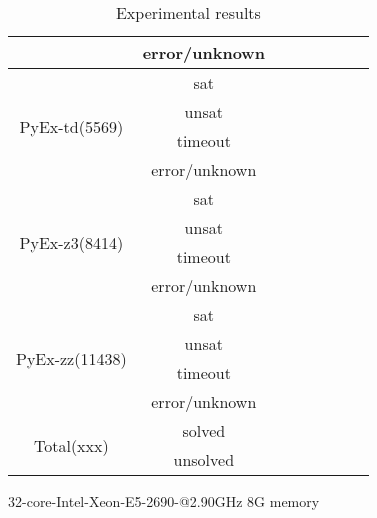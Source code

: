 \begin{table}[htbp]
\begin{center}
\begin{tabular}{|c|c|c|c|c|c|c|c|}
\cline{2-8}
 & error/unknown &  &  &  &  & &\\
\hline
\multirow{4}{*}{PyEx-td(5569)} & \cellcolor{Gray} sat & \cellcolor{Gray} & \cellcolor{Gray} & \cellcolor{Gray} & \cellcolor{Gray} & \cellcolor{Gray} & \cellcolor{Gray}\\
\cline{2-8}
 & unsat &  &  &  &  & &\\
\cline{2-8}
 & \cellcolor{Gray}  timeout & \cellcolor{Gray} & \cellcolor{Gray} & \cellcolor{Gray} & \cellcolor{Gray} &\cellcolor{Gray} &\cellcolor{Gray} \\
\cline{2-8}
 & error/unknown &  &  &  &  & &\\
\hline
\multirow{4}{*}{PyEx-z3(8414)} & \cellcolor{Gray} sat & \cellcolor{Gray} & \cellcolor{Gray} & \cellcolor{Gray} & \cellcolor{Gray} & \cellcolor{Gray} & \cellcolor{Gray}\\
\cline{2-8}
 & unsat &  &  &  &  & &\\
\cline{2-8}
 & \cellcolor{Gray}  timeout & \cellcolor{Gray} & \cellcolor{Gray} & \cellcolor{Gray} & \cellcolor{Gray} &\cellcolor{Gray} &\cellcolor{Gray} \\
\cline{2-8}
 & error/unknown &  &  &  &  & &\\
\hline
\multirow{4}{*}{PyEx-zz(11438)} & \cellcolor{Gray} sat & \cellcolor{Gray} & \cellcolor{Gray} & \cellcolor{Gray} & \cellcolor{Gray} & \cellcolor{Gray} & \cellcolor{Gray}\\
\cline{2-8}
 & unsat &  &  &  &  & &\\
\cline{2-8}
 & \cellcolor{Gray}  timeout & \cellcolor{Gray} & \cellcolor{Gray} & \cellcolor{Gray} & \cellcolor{Gray} &\cellcolor{Gray} &\cellcolor{Gray} \\
\cline{2-8}
 & error/unknown &  &  &  &  & &\\
\hline
\multirow{2}{*}{Total(xxx)} & \cellcolor{Gray} solved & \cellcolor{Gray} & \cellcolor{Gray} & \cellcolor{Gray} & \cellcolor{Gray} & \cellcolor{Gray} & \cellcolor{Gray}\\
\cline{2-8}
 & \cellcolor{Gray}  unsolved & \cellcolor{Gray} & \cellcolor{Gray} & \cellcolor{Gray} & \cellcolor{Gray} &\cellcolor{Gray} &\cellcolor{Gray} \\
\hline
\end{tabular}
\end{center}
\caption{Experimental results}
\label{tab-experiment}
\end{table}%



32-core-Intel-Xeon-E5-2690-@2.90GHz
8G memory

